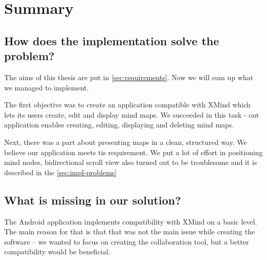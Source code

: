 %
%
%
%
%

\chapter{Summary}
\label{chap:summary}



\section{How does the implementation solve the problem?}
\label{summary-how-solve}
The aims of this thesis are put in \cref{sec:requirements}. Now we will sum up what we managed to implement. 
 
The first objective was to create an application compatible with XMind which lets its users create, edit and display mind maps. We succeeded in this task - out application enables creating, editing, displaying and deleting mind maps. 

Next, there was a part about presenting maps in a clean, structured way. We believe our application meets tis requirement. We put a lot of effort in positioning mind nodes, bidirectional scroll view also turned out to be troublesome and it is described in the \cref{sec:impl-problems}

\section{What is missing in our solution?}
\label{summary-missing}
The Android application implements compatibility with XMind on a basic level. The main reason for that is that that was not the main issue while creating the software -- we wanted to focus on creating the collaboration tool, but a better compatibility would be beneficial. 

